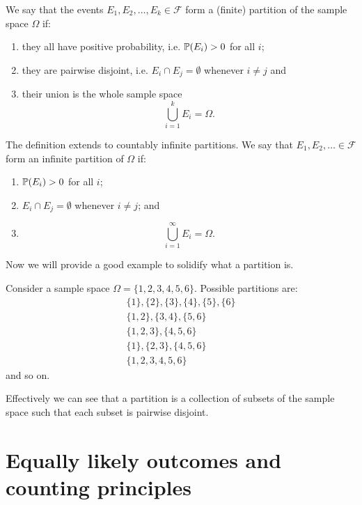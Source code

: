 \documentclass[10pt, a4paper]{article}
\begin{document}
\begin{definition}[Partition]
    We say that the events $E_1, E_2, \dotsc, E_k \in \mathcal{F}$ form a (finite) partition of the sample space $\Omega$ if:
    \begin{enumerate}[label = (\roman*)]
        \item they all have positive probability, i.e. $\P(E_i) > 0$ for all $i$;
        \item they are pairwise disjoint, i.e. $E_i \cap E_j = \emptyset$ whenever $i \neq j$ and
        \item their union is the whole sample space
        \[
        \bigcup_{i = 1}^{k}E_i = \Omega.
        \]
    \end{enumerate}
    The definition extends to countably infinite partitions.
    We say that $E_1, E_2, \dotsc \in \mathcal{F}$ form an infinite partition of $\Omega$ if:
    \begin{enumerate}[label = (\roman*)]
        \item $\P(E_i) > 0$ for all $i$;
        \item $E_i \cap E_j = \emptyset$ whenever $i \neq j$; and
        \item
        \[
        \bigcup_{i = 1}^{\infty}E_i = \Omega.
        \]
    \end{enumerate}
\end{definition}
Now we will provide a good example to solidify what a partition is.
\begin{example}
    Consider a sample space $\Omega = \{1, 2, 3, 4, 5, 6\}$.
    Possible partitions are:
    \begin{multline*}
        \{1\}, \{2\}, \{3\}, \{4\}, \{5\}, \{6\} \\
        \{1, 2\}, \{3, 4\}, \{5, 6\} \\
        \{1, 2, 3\}, \{4, 5, 6\} \\
        \{1\}, \{2, 3\}, \{4, 5, 6\} \\
        \{1, 2, 3, 4, 5, 6\}
    \end{multline*}
    and so on.
\end{example}
Effectively we can see that a partition is a collection of subsets of the sample space such that each subset is pairwise disjoint.

\section{Equally likely outcomes and counting principles}
\end{document}
